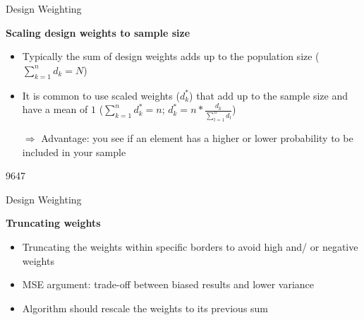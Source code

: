 \documentclass[11pt,german,hideothersubsections]{beamer}
\begin{document}
\begin{frame}[fragile]{Design Weighting}
\footnotesize{
\begin{center}
\textbf{Scaling design weights to sample size}
\end{center}

\begin{itemize}
\item Typically the sum of design weights adds up to the population size ($\sum_{k=1}^{n}d_k=N$)
\item It is common to use scaled weights ($d_k^*$) that add up to the sample size and have a mean of $1$  ($\sum_{k=1}^{n}d_k^*=n$; $d_k^*=n*\frac{d_k}{\sum_{l=1}^n d_l}$)
\item[$\Rightarrow$] Advantage: you see if an element has a higher or lower probability to be included in your sample 
\end{itemize}
\vspace{.25cm}
\begin{Schunk}
\begin{Soutput}
[1] 9647
\end{Soutput}
\end{Schunk}
}
\end{frame}

\begin{frame}[fragile]{Design Weighting}
\footnotesize{
\begin{center}
\textbf{Truncating weights}
\end{center}
\begin{itemize}
\item Truncating the weights within specific borders to avoid high and/ or negative weights
\item MSE argument: trade-off between biased results and lower variance
\item Algorithm should rescale the weights to its previous sum
\end{itemize}
}
\end{frame}
\end{document}
